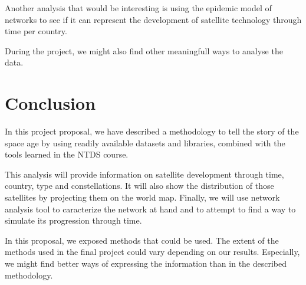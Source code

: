 \documentclass[11pt,letterpaper]{article}
\begin{document}
 Another analysis that would be interesting is using the epidemic model of networks to see if it can represent the development of satellite technology through time per country.

 During the project, we might also find other meaningfull ways to analyse the data.


\section{Conclusion}

In this project proposal, we have described a methodology to tell the story of the space age by using readily available datasets and libraries, combined with the tools learned in the NTDS course.

This analysis will provide information on satellite development through time, country, type and constellations.
It will also show the distribution of those satellites by projecting them on the world map. 
Finally, we will use network analysis tool to caracterize the network at hand and to attempt to find a way to simulate its progression through time.

In this proposal, we exposed methods that could be used. The extent of the methods used in the final project could vary depending on our results.
Especially, we might find better ways of expressing the information than in the described methodology.
\end{document}
